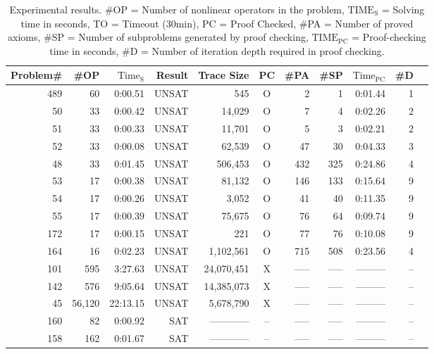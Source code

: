 \begin{table}[h]
  \begin{center}
    \begin{tabular}{|r||r|r|r||r||c|r|r|r|r|r|}
      \hline
      Problem\#&  \#OP  & $\mathrm{Time_S}$&    Result&     Trace Size& PC&  \#PA& \#SP& $\mathrm{Time_{PC}}$ & \#D\\
      \hline
      \hline
      489&       60&   0:00.51&     UNSAT&            545&O&    2&    1& 0:01.44& 1\\
      \hline
       50&       33&   0:00.42&     UNSAT&         14,029&O&    7&    4& 0:02.26& 2\\
      \hline
       51&       33&   0:00.33&     UNSAT&         11,701&O&    5&    3& 0:02.21& 2\\
      \hline
       52&       33&   0:00.08&     UNSAT&         62,539&O&   47&   30& 0:04.33& 3\\
      \hline
       48&       33&   0:01.45&     UNSAT&        506,453&O&  432&  325& 0:24.86& 4\\
      \hline
       53&       17&   0:00.38&     UNSAT&         81,132&O&  146&  133& 0:15.64& 9\\
      \hline
       54&       17&   0:00.26&     UNSAT&          3,052&O&   41&   40& 0:11.35& 9\\
      \hline
       55&       17&   0:00.39&     UNSAT&         75,675&O&   76&   64& 0:09.74& 9\\
      \hline
      172&       17&   0:00.15&     UNSAT&            221&O&   77&   76& 0:10.08& 9\\
      \hline
      164&       16&   0:02.23&     UNSAT&      1,102,561&O&  715&  508& 0:23.56& 4\\
      \hline
      101&      595&   3:27.63&     UNSAT&     24,070,451&X&  -----& -----& --------- & --\\
      \hline
      142&      576&   9:05.64&     UNSAT&     14,385,073&X&  -----& -----& --------- & --\\
      \hline
       45&   56,120&  22:13.15&     UNSAT&      5,678,790&X&  -----& -----& --------- & --\\
      \hline
     \hline
      160&       82&   0:00.92&       SAT&  ------------ &--& -----& -----& --------- & --\\
      \hline
      158&      162&   0:01.67&       SAT&  ------------ &--& -----& -----& --------- & --\\
     \hline
    \end{tabular}
  \end{center}
  \caption{
    Experimental results.
    \#OP = Number of nonlinear operators in the problem,
    $\mathrm{TIME_S}$ = Solving time in seconds,
    TO = Timeout (30min),
    PC = Proof Checked,
    \#PA = Number of proved axioms,
    \#SP = Number of subproblems generated by proof checking,
    $\mathrm{TIME_{PC}}$ = Proof-checking time in seconds,
    \#D = Number of iteration depth required in proof checking.
  }\label{tbl:exp}
\end{table}
